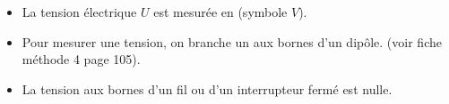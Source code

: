 \begin{mybilan}
	\begin{itemize}
		\item La tension électrique $U$ est mesurée en  (symbole $V$). %
		
		\item Pour mesurer une tension, on branche un  aux bornes d'un dipôle. (voir fiche méthode 4 page 105).\pause
		
		\item La tension aux bornes d'un fil ou d'un interrupteur fermé est nulle.
		
		
	\end{itemize}
	 
	
\end{mybilan}